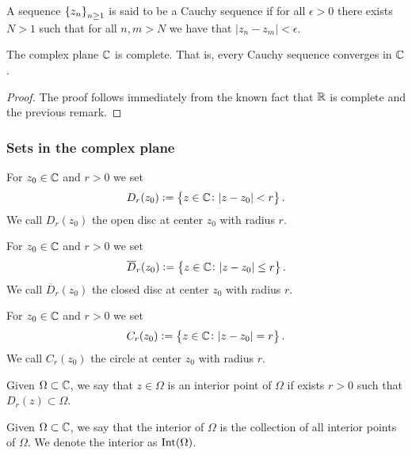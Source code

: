\documentclass[11pt,a4paper]{article}
\begin{document}
\begin{definition}
  A sequence $\set{z_n}_{n \geq 1}$ is said to be a Cauchy sequence if for
  all $\epsilon > 0$ there exists $N > 1$ such that for all $n,m > N$
  we have that $|z_n - z_m| < \epsilon$.
\end{definition}

\begin{proposition}
  The complex plane $\mathbb{C}$ is complete.
  That is, every Cauchy sequence converges in $\mathbb{C}$.
\end{proposition}
\begin{proof}
  The proof follows immediately from the known fact that $\mathbb{R}$ is complete
  and the previous remark.
\end{proof}

\subsubsection{Sets in the complex plane}

\begin{definition}
  For $z_0 \in \mathbb{C}$ and $r > 0$ we set
  \[
      D_r(z_0) := \set{z \in \mathbb{C}\colon |z - z_0| < r}.
  \]
  We call $D_r(z_0)$ the open disc at center $z_0$ with radius $r$.
\end{definition}


\begin{definition}
  For $z_0 \in \mathbb{C}$ and $r > 0$ we set
  \[
      \overline D_r(z_0) := \set{z \in \mathbb{C}\colon |z - z_0| \le r}.
  \]
  We call $\overline D_r(z_0)$ the closed disc at center $z_0$ with
  radius $r$.
\end{definition}

\begin{definition}[Circle]
  For $z_0 \in \mathbb{C}$ and $r > 0$ we set
  \[
      C_r(z_0) := \set{z \in \mathbb{C}\colon |z - z_0| = r}.
  \]
  We call $C_r(z_0)$ the circle at center $z_0$ with radius $r$.
\end{definition}

\begin{definition}
  Given $\Omega \subset \mathbb{C}$, we say that $z \in \Omega$ is an interior
  point of $\Omega$ if exists $r > 0$ such that $D_r(z) \subset \Omega$.
\end{definition}

\begin{definition}
  Given $\Omega \subset \mathbb{C}$, we say that the interior of $\Omega$ is
  the collection of all interior points of $\Omega$.
  We denote the interior as $\operatorname{Int}(\Omega)$.
\end{definition}
\end{document}
